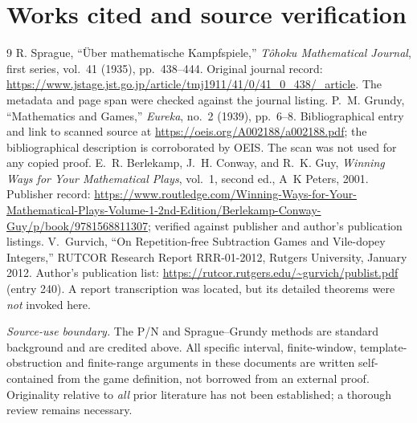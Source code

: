 \section*{Works cited and source verification}
\begin{thebibliography}{9}
R. Sprague, ``\"Uber mathematische Kampfspiele,'' \emph{T\^ohoku Mathematical Journal}, first series, vol.~41 (1935), pp.~438--444.\newline
Original journal record: \url{https://www.jstage.jst.go.jp/article/tmj1911/41/0/41_0_438/_article}. The metadata and page span were checked against the journal listing.
P.~M. Grundy, ``Mathematics and Games,'' \emph{Eureka}, no.~2 (1939), pp.~6--8.\newline
Bibliographical entry and link to scanned source at \url{https://oeis.org/A002188/a002188.pdf}; the bibliographical description is corroborated by OEIS. The scan was not used for any copied proof.
E.~R. Berlekamp, J.~H. Conway, and R.~K. Guy, \emph{Winning Ways for Your Mathematical Plays}, vol.~1, second ed., A~K Peters, 2001.\newline
Publisher record: \url{https://www.routledge.com/Winning-Ways-for-Your-Mathematical-Plays-Volume-1-2nd-Edition/Berlekamp-Conway-Guy/p/book/9781568811307}; verified against publisher and author's publication listings.
V.~Gurvich, ``On Repetition-free Subtraction Games and Vile-dopey Integers,'' RUTCOR Research Report RRR-01-2012, Rutgers University, January 2012.\newline
Author's publication list: \url{https://rutcor.rutgers.edu/~gurvich/publist.pdf} (entry 240). A report transcription was located, but its detailed theorems were \emph{not} invoked here.
\end{thebibliography}
\textit{Source-use boundary.} The P/N and Sprague--Grundy methods are standard background and are credited above. All specific interval, finite-window, template-obstruction and finite-range arguments in these documents are written self-contained from the game definition, not borrowed from an external proof. Originality relative to \emph{all} prior literature has not been established; a thorough review remains necessary.
